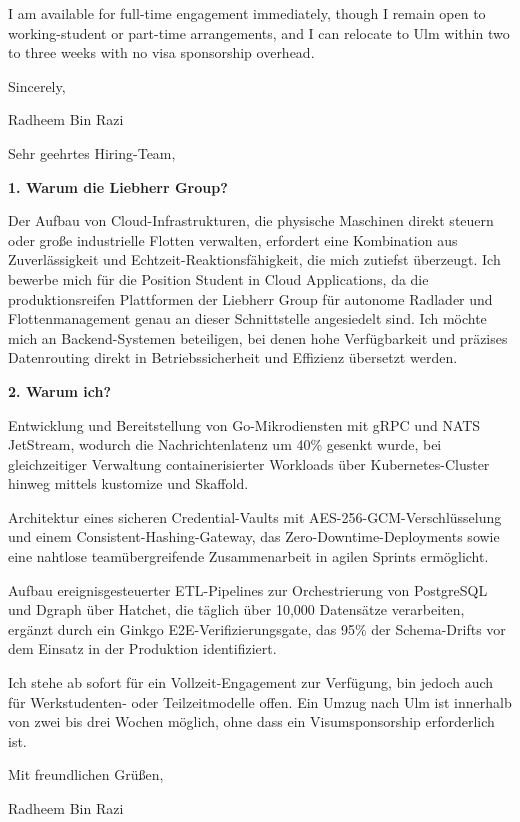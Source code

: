 \documentclass[11pt,a4paper]{coverletter}
\begin{document}
I am available for full-time engagement immediately, though I remain open to working-student or part-time arrangements, and I can relocate to Ulm within two to three weeks with no visa sponsorship overhead.

\closing{Sincerely,}{Radheem Bin Razi}

\clearpage
{}


\opening{Sehr geehrtes Hiring-Team,}

\vspace{8pt}\noindent\textbf{1. Warum die Liebherr Group?}\par\vspace{3pt}

Der Aufbau von Cloud-Infrastrukturen, die physische Maschinen direkt steuern oder große industrielle Flotten verwalten, erfordert eine Kombination aus Zuverlässigkeit und Echtzeit-Reaktionsfähigkeit, die mich zutiefst überzeugt. Ich bewerbe mich für die Position Student in Cloud Applications, da die produktionsreifen Plattformen der Liebherr Group für autonome Radlader und Flottenmanagement genau an dieser Schnittstelle angesiedelt sind. Ich möchte mich an Backend-Systemen beteiligen, bei denen hohe Verfügbarkeit und präzises Datenrouting direkt in Betriebssicherheit und Effizienz übersetzt werden.

\vspace{8pt}\noindent\textbf{2. Warum ich?}\par\vspace{3pt}

\bullets

  \item Entwicklung und Bereitstellung von Go-Mikrodiensten mit gRPC und NATS JetStream, wodurch die Nachrichtenlatenz um 40\% gesenkt wurde, bei gleichzeitiger Verwaltung containerisierter Workloads über Kubernetes-Cluster hinweg mittels kustomize und Skaffold.

  \item Architektur eines sicheren Credential-Vaults mit AES-256-GCM-Verschlüsselung und einem Consistent-Hashing-Gateway, das Zero-Downtime-Deployments sowie eine nahtlose teamübergreifende Zusammenarbeit in agilen Sprints ermöglicht.

  \item Aufbau ereignisgesteuerter ETL-Pipelines zur Orchestrierung von PostgreSQL und Dgraph über Hatchet, die täglich über 10,000 Datensätze verarbeiten, ergänzt durch ein Ginkgo E2E-Verifizierungsgate, das 95\% der Schema-Drifts vor dem Einsatz in der Produktion identifiziert.

\bulletsend

Ich stehe ab sofort für ein Vollzeit-Engagement zur Verfügung, bin jedoch auch für Werkstudenten- oder Teilzeitmodelle offen. Ein Umzug nach Ulm ist innerhalb von zwei bis drei Wochen möglich, ohne dass ein Visumsponsorship erforderlich ist.

\closing{Mit freundlichen Grüßen,}{Radheem Bin Razi}
\end{document}
